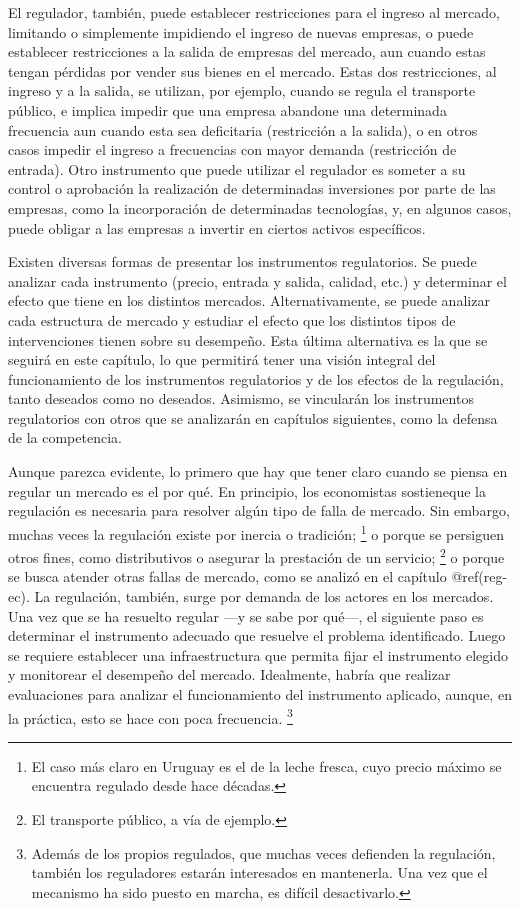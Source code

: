 \documentclass[
  12pt,
  spanish,
]{book}
\begin{document}
El regulador, también, puede establecer restricciones para el ingreso al
mercado, limitando o simplemente impidiendo el ingreso de nuevas
empresas, o puede establecer restricciones a la salida de empresas del
mercado, aun cuando estas tengan pérdidas por vender sus bienes en el
mercado. Estas dos restricciones, al ingreso y a la salida, se utilizan,
por ejemplo, cuando se regula el transporte público, e implica impedir
que una empresa abandone una determinada frecuencia aun cuando esta sea
deficitaria (restricción a la salida), o en otros casos impedir el
ingreso a frecuencias con mayor demanda (restricción de entrada). Otro
instrumento que puede utilizar el regulador es someter a su control o
aprobación la realización de determinadas inversiones por parte de las
empresas, como la incorporación de determinadas tecnologías, y, en
algunos casos, puede obligar a las empresas a invertir en ciertos
activos específicos.

Existen diversas formas de presentar los instrumentos regulatorios. Se
puede analizar cada instrumento (precio, entrada y salida, calidad,
etc.) y determinar el efecto que tiene en los distintos mercados.
Alternativamente, se puede analizar cada estructura de mercado y
estudiar el efecto que los distintos tipos de intervenciones tienen
sobre su desempeño. Esta última alternativa es la que se seguirá en este
capítulo, lo que permitirá tener una visión integral del funcionamiento
de los instrumentos regulatorios y de los efectos de la regulación,
tanto deseados como no deseados. Asimismo, se vincularán los
instrumentos regulatorios con otros que se analizarán en capítulos
siguientes, como la defensa de la competencia.

Aunque parezca evidente, lo primero que hay que tener claro cuando se
piensa en regular un mercado es el por qué. En principio, los
economistas sostieneque la regulación es necesaria para resolver algún
tipo de falla de mercado. Sin embargo, muchas veces la regulación existe
por inercia o tradición; \footnote{El caso más claro en Uruguay es el de
  la leche fresca, cuyo precio máximo se encuentra regulado desde hace
  décadas.} o porque se persiguen otros fines, como distributivos o
asegurar la prestación de un servicio; \footnote{El transporte público,
  a vía de ejemplo.} o porque se busca atender otras fallas de mercado,
como se analizó en el capítulo @ref(reg-ec). La regulación, también,
surge por demanda de los actores en los mercados. Una vez que se ha
resuelto regular ---y se sabe por qué---, el siguiente paso es
determinar el instrumento adecuado que resuelve el problema
identificado. Luego se requiere establecer una infraestructura que
permita fijar el instrumento elegido y monitorear el desempeño del
mercado. Idealmente, habría que realizar evaluaciones para analizar el
funcionamiento del instrumento aplicado, aunque, en la práctica, esto se
hace con poca frecuencia. \footnote{Además de los propios regulados, que
  muchas veces defienden la regulación, también los reguladores estarán
  interesados en mantenerla. Una vez que el mecanismo ha sido puesto en
  marcha, es difícil desactivarlo.}
\end{document}
